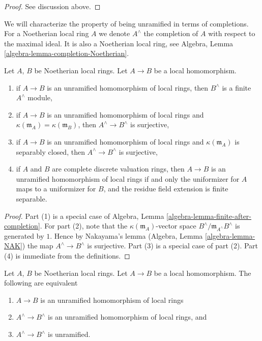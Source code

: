 \begin{proof}
See discussion above.
\end{proof}

\noindent
We will characterize the property of being unramified in terms
of completions. For a Noetherian local ring $A$
we denote $A^\wedge$ the completion of $A$ with respect to the
maximal ideal. It is also a Noetherian local ring, see
Algebra, Lemma \ref{algebra-lemma-completion-Noetherian}.

\begin{lemma}
\label{lemma-unramified-completions}
Let $A$, $B$ be Noetherian local rings.
Let $A \to B$ be a local homomorphism.
\begin{enumerate}
\item if $A \to B$ is an unramified homomorphism of local rings,
then $B^\wedge$ is a finite $A^\wedge$ module,
\item if $A \to B$ is an unramified homomorphism of local rings and
$\kappa(\mathfrak m_A) = \kappa(\mathfrak m_B)$,
then $A^\wedge \to B^\wedge$ is surjective,
\item if $A \to B$ is an unramified homomorphism of local rings and $\kappa(\mathfrak m_A)$
is separably closed, then $A^\wedge \to B^\wedge$ is surjective,
\item if $A$ and $B$ are complete discrete valuation rings, then
$A \to B$ is an unramified homomorphism of local rings
if and only the uniformizer for
$A$ maps to a uniformizer for $B$, and the residue field extension
is finite separable.
\end{enumerate}
\end{lemma}

\begin{proof}
Part (1) is a special case of
Algebra, Lemma \ref{algebra-lemma-finite-after-completion}.
For part (2), note that the $\kappa(\mathfrak m_A)$-vector space
$B^\wedge/\mathfrak m_{A^\wedge}B^\wedge$
is generated by $1$. Hence by Nakayama's lemma
(Algebra, Lemma \ref{algebra-lemma-NAK}) the map
$A^\wedge \to B^\wedge$ is surjective.
Part (3) is a special case of part (2).
Part (4) is immediate from the definitions.
\end{proof}

\begin{lemma}
\label{lemma-characterize-unramified-completions}
Let $A$, $B$ be Noetherian local rings.
Let $A \to B$ be a local homomorphism.
The following are equivalent
\begin{enumerate}
\item $A \to B$ is an unramified homomorphism of local rings
\item $A^\wedge \to B^\wedge$ is an unramified homomorphism of local rings, and
\item $A^\wedge \to B^\wedge$ is unramified.
\end{enumerate}
\end{lemma}

